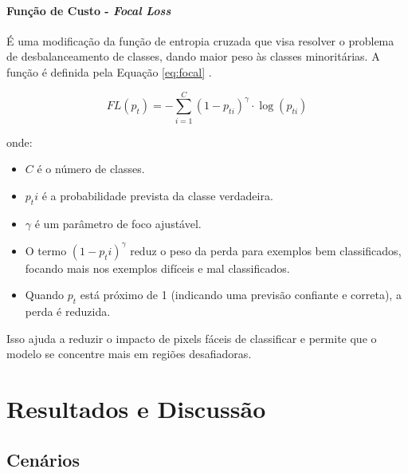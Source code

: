 \documentclass[%
  10pt,%
  aspectratio = 169,%
  compress,%
  t,%
  english,%
  brazilian,%
  tikz,
]{beamer}
\begin{document}
\begin{frame}
\framesubtitle{Função de Custo - \textit{Focal Loss}}

É uma modificação da função de entropia cruzada que visa resolver o problema de desbalanceamento de classes, dando maior peso às classes minoritárias. A função é definida pela Equação \ref{eq:focal} \cite{FocalLoss2020}.

\begin{equation}\label{eq:focal}
FL(p_t) = -\sum_{i=1}^{C} (1 - p_{ti})^\gamma \cdot \log(p_{ti})
\end{equation}

\noindent
onde:
\begin{itemize}
    \item \(C\) é o número de classes.
    \item \(p_ti\) é a probabilidade prevista da classe verdadeira.
    \item \(\gamma\) é um parâmetro de foco ajustável.
    \item O termo \((1 - p_ti)^\gamma\) reduz o peso da perda para exemplos bem classificados, focando mais nos exemplos difíceis e mal classificados.
    \item Quando \(p_t\) está próximo de 1 (indicando uma previsão confiante e correta), a perda é reduzida.
\end{itemize}

Isso ajuda a reduzir o impacto de pixels fáceis de classificar e permite que o modelo se concentre mais em regiões desafiadoras.

\end{frame}

\section{Resultados e Discussão}\label{sec:resuldisc}

\subsection{Cenários}\label{ssec:resuldisc1}
\end{document}
